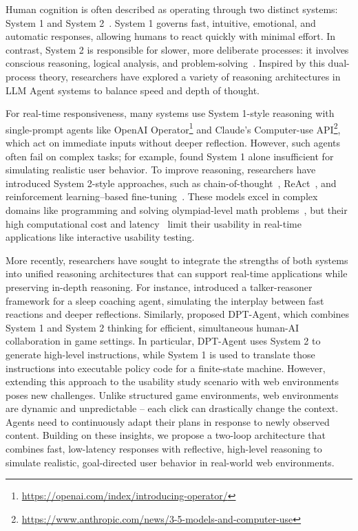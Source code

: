 \documentclass[manuscript,review,anonymous]{acmart}
\begin{document}
Human cognition is often described as operating through two distinct systems: System 1 and System 2~\cite{kahneman2011thinking}.
System 1 governs fast, intuitive, emotional, and automatic responses, allowing humans to react quickly with minimal effort.
In contrast, System 2 is responsible for slower, more deliberate processes: it involves conscious reasoning, logical analysis, and problem-solving~\cite{kahneman2011thinking,evansDualProcessTheoriesHigher2013}.
Inspired by this dual-process theory, researchers have explored a variety of reasoning architectures in LLM Agent systems to balance speed and depth of thought.


For real-time responsiveness, many systems use System 1-style reasoning with single-prompt agents like OpenAI Operator\footnote{\url{https://openai.com/index/introducing-operator/}} and Claude’s Computer-use API\footnote{\url{https://www.anthropic.com/news/3-5-models-and-computer-use}}, which act on immediate inputs without deeper reflection. However, such agents often fail on complex tasks; for example, \citet{luPromptingNotAll2025} found System 1 alone insufficient for simulating realistic user behavior. To improve reasoning, researchers have introduced System 2-style approaches, such as chain-of-thought~\cite{weiChainofThoughtPromptingElicits2023}, ReAct~\cite{yaoReActSynergizingReasoning2023}, and reinforcement learning–based fine-tuning~\cite{deepseek-aiDeepSeekR1IncentivizingReasoning2025}.
These models excel in complex domains like programming and solving olympiad-level math problems~\cite{deepseek-aiDeepSeekR1IncentivizingReasoning2025,sunChallengingBoundariesReasoning2025}, but their high computational cost and latency~\cite{zhouSurveyEfficientInference2024,huaInteractiveSpeculativePlanning2024} limit their usability in real-time applications like interactive usability testing.

More recently, researchers have sought to integrate the strengths of both systems into unified reasoning architectures that can support real-time applications while preserving in-depth reasoning.
For instance, \citet{christakopoulouAgentsThinkingFast2024} introduced a talker-reasoner framework for a sleep coaching agent, simulating the interplay between fast reactions and deeper reflections.
Similarly, \citet{zhangLeveragingDualProcess2025} proposed DPT-Agent, which combines System 1 and System 2 thinking for efficient, simultaneous human-AI collaboration in game settings.
In particular, DPT-Agent uses System 2 to generate high-level instructions, while System 1 is used to translate those instructions into executable policy code for a finite-state machine.
However, extending this approach to the usability study scenario with web environments poses new challenges. 
Unlike structured game environments, web environments are dynamic and unpredictable -- each click can drastically change the context.
Agents need to continuously adapt their plans in response to newly observed content.
Building on these insights, we propose a two-loop architecture that combines fast, low-latency responses with reflective, high-level reasoning to simulate realistic, goal-directed user behavior in real-world web environments.
\end{document}
